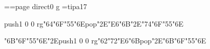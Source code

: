 \footline={\tenrm\it \hfill\folio\hfill}\chardef\match=\pdfcolorstackinit page direct{0 g} \font\ipa=tipa17 \pdfpagewidth 5.5in \pdfpageheight 8.5in \hsize 4.5in \vsize 7in \hoffset -0.5in \voffset -0.375in
\null\vfill
\centerline{\pdfcolorstack\match push{1 0 0 rg}\ipa\char"64\ipa\char"6F\ipa\char"55\ipa\char"6E\pdfcolorstack\match pop{}\ipa\char"2E\ipa\char"E6\ipa\char"6B\ipa\char"2E\ipa\char"74\ipa\char"6F\ipa\char"55\ipa\char"6E}
\vfill\eject
\null\vfill
\centerline{\ipa\char"6B\ipa\char"6F\ipa\char"55\ipa\char"6E\ipa\char"2E\pdfcolorstack\match push{1 0 0 rg}\ipa\char"62\ipa\char"72\ipa\char"E6\ipa\char"6B\pdfcolorstack\match pop{}\ipa\char"2E\ipa\char"6B\ipa\char"6F\ipa\char"55\ipa\char"6E}
\vfill\eject
